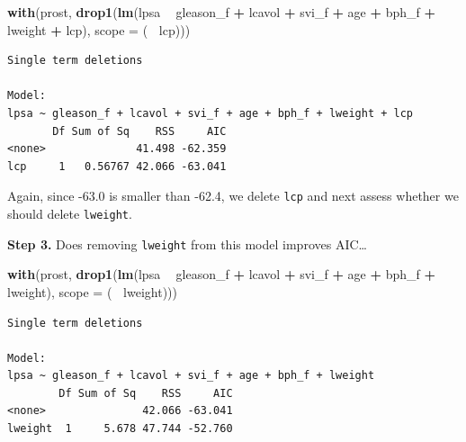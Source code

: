 \documentclass[]{book}
\newenvironment{Shaded}{\begin{snugshade}}{\end{snugshade}}
\newcommand{\KeywordTok}[1]{\textcolor[rgb]{0.13,0.29,0.53}{\textbf{#1}}}
\newcommand{\DataTypeTok}[1]{\textcolor[rgb]{0.13,0.29,0.53}{#1}}
\newcommand{\StringTok}[1]{\textcolor[rgb]{0.31,0.60,0.02}{#1}}
\newcommand{\OperatorTok}[1]{\textcolor[rgb]{0.81,0.36,0.00}{\textbf{#1}}}
\newcommand{\NormalTok}[1]{#1}
\theoremstyle{definition}
\theoremstyle{definition}
\theoremstyle{definition}
\theoremstyle{remark}
\begin{document}
\begin{Shaded}
\begin{Highlighting}[]
\KeywordTok{with}\NormalTok{(prost, }\KeywordTok{drop1}\NormalTok{(}\KeywordTok{lm}\NormalTok{(lpsa }\OperatorTok{~}\StringTok{ }\NormalTok{gleason_f }\OperatorTok{+}\StringTok{ }\NormalTok{lcavol }\OperatorTok{+}\StringTok{ }\NormalTok{svi_f }\OperatorTok{+}\StringTok{ }
\StringTok{              }\NormalTok{age }\OperatorTok{+}\StringTok{ }\NormalTok{bph_f }\OperatorTok{+}\StringTok{ }\NormalTok{lweight  }\OperatorTok{+}\StringTok{ }\NormalTok{lcp),}
              \DataTypeTok{scope =}\NormalTok{ (}\OperatorTok{~}\StringTok{ }\NormalTok{lcp)))}
\end{Highlighting}
\end{Shaded}

\begin{verbatim}
Single term deletions

Model:
lpsa ~ gleason_f + lcavol + svi_f + age + bph_f + lweight + lcp
       Df Sum of Sq    RSS     AIC
<none>              41.498 -62.359
lcp     1   0.56767 42.066 -63.041
\end{verbatim}

Again, since -63.0 is smaller than -62.4, we delete \texttt{lcp} and
next assess whether we should delete \texttt{lweight}.

\textbf{Step 3.} Does removing \texttt{lweight} from this model improves
AIC\ldots{}

\begin{Shaded}
\begin{Highlighting}[]
\KeywordTok{with}\NormalTok{(prost, }\KeywordTok{drop1}\NormalTok{(}\KeywordTok{lm}\NormalTok{(lpsa }\OperatorTok{~}\StringTok{ }\NormalTok{gleason_f }\OperatorTok{+}\StringTok{ }\NormalTok{lcavol }\OperatorTok{+}\StringTok{ }\NormalTok{svi_f }\OperatorTok{+}\StringTok{ }
\StringTok{              }\NormalTok{age }\OperatorTok{+}\StringTok{ }\NormalTok{bph_f }\OperatorTok{+}\StringTok{ }\NormalTok{lweight),}
              \DataTypeTok{scope =}\NormalTok{ (}\OperatorTok{~}\StringTok{ }\NormalTok{lweight)))}
\end{Highlighting}
\end{Shaded}

\begin{verbatim}
Single term deletions

Model:
lpsa ~ gleason_f + lcavol + svi_f + age + bph_f + lweight
        Df Sum of Sq    RSS     AIC
<none>               42.066 -63.041
lweight  1     5.678 47.744 -52.760
\end{verbatim}
\end{document}
